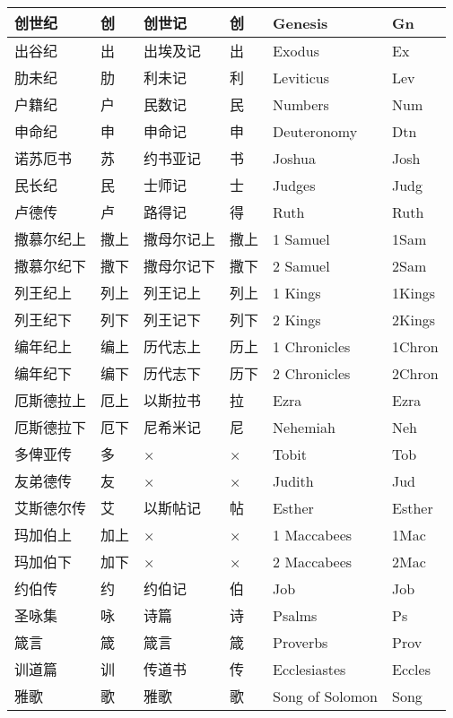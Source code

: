 {\begin{longtable}{|l|l|l|l|l|l|}
		创世纪 & 创 & 创世记 & 创 & Genesis & Gn \\
		\hline
		出谷纪 & 出 & 出埃及记 & 出 & Exodus & Ex \\
		\hline
		肋未纪 & 肋 & 利未记 & 利 & Leviticus & Lev \\
		\hline
		户籍纪 & 户 & 民数记 & 民 & Numbers & Num \\
		\hline
		申命纪 & 申 & 申命记 & 申 & Deuteronomy & Dtn \\
		\hline
		诺苏厄书 & 苏 & 约书亚记 & 书 & Joshua & Josh \\
		\hline
		民长纪 & 民 & 士师记 & 士 & Judges & Judg \\
		\hline
		卢德传 & 卢 & 路得记 & 得 & Ruth & Ruth \\
		\hline
		撒慕尔纪上 & 撒上 & 撒母尔记上 & 撒上 & 1 Samuel & 1Sam \\
		\hline
		撒慕尔纪下 & 撒下 & 撒母尔记下 & 撒下 & 2 Samuel & 2Sam \\
		\hline
		列王纪上 & 列上 & 列王记上 & 列上 & 1 Kings & 1Kings \\
		\hline
		列王纪下 & 列下 & 列王记下 & 列下 & 2 Kings & 2Kings \\
		\hline
		编年纪上 & 编上 & 历代志上 & 历上 & 1 Chronicles & 1Chron \\
		\hline
		编年纪下 & 编下 & 历代志下 & 历下 & 2 Chronicles & 2Chron \\
		\hline
		厄斯德拉上 & 厄上 & 以斯拉书 & 拉 & Ezra & Ezra \\
		\hline
		厄斯德拉下 & 厄下 & 尼希米记 & 尼 & Nehemiah & Neh \\
		\hline
		多俾亚传 & 多 & × & × & Tobit & Tob \\
		\hline
		友弟德传 & 友 & × & × & Judith & Jud \\
		\hline
		艾斯德尔传 & 艾 & 以斯帖记 & 帖 & Esther & Esther \\
		\hline
		玛加伯上 & 加上 & × & × & 1 Maccabees & 1Mac \\
		\hline
		玛加伯下 & 加下 & × & × & 2 Maccabees & 2Mac \\
		\hline
		约伯传 & 约 & 约伯记 & 伯 & Job & Job \\
		\hline
		圣咏集 & 咏 & 诗篇 & 诗 & Psalms & Ps \\
		\hline
		箴言 & 箴 & 箴言 & 箴 & Proverbs & Prov \\
		\hline
		训道篇 & 训 & 传道书 & 传 & Ecclesiastes & Eccles \\
		\hline
		雅歌 & 歌 & 雅歌 & 歌 & Song of Solomon & Song \\
		\hline

\end{longtable}}
